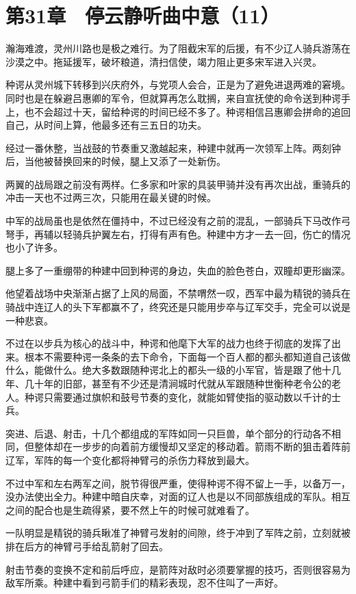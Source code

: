 \section{第31章　停云静听曲中意（11）}

瀚海难渡，灵州川路也是极之难行。为了阻截宋军的后援，有不少辽人骑兵游荡在沙漠之中。拖延援军，破坏粮道，清扫信使，竭力阻止更多宋军进入兴灵。

种谔从灵州城下转移到兴庆府外，与党项人会合，正是为了避免进退两难的窘境。同时也是在躲避吕惠卿的军令，但就算再怎么耽搁，来自宣抚使的命令送到种谔手上，也不会超过十天，留给种谔的时间已经不多了。种谔相信吕惠卿会拼命的追回自己，从时间上算，他最多还有三五日的功夫。

经过一番休整，当战鼓的节奏重又激越起来，种建中就再一次领军上阵。两刻钟后，当他被替换回来的时候，腿上又添了一处新伤。

两翼的战局跟之前没有两样。仁多家和叶家的具装甲骑并没有再次出战，重骑兵的冲击一天也不过两三次，只能用在最关键的时候。

中军的战局虽也是依然在僵持中，不过已经没有之前的混乱，一部骑兵下马改作弓弩手，再辅以轻骑兵护翼左右，打得有声有色。种建中方才一去一回，伤亡的情况也小了许多。

腿上多了一重绷带的种建中回到种谔的身边，失血的脸色苍白，双瞳却更形幽深。

他望着战场中央渐渐占据了上风的局面，不禁喟然一叹，西军中最为精锐的骑兵在骑战中连辽人的头下军都赢不了，终究还是只能用步卒与辽军交手，完全可以说是一种悲哀。

不过在以步兵为核心的战斗中，种谔和他麾下大军的战力也终于彻底的发挥了出来。根本不需要种谔一条条的去下命令，下面每一个百人都的都头都知道自己该做什么，能做什么。绝大多数跟随种谔北上的都头一级的小军官，皆是跟了他十几年、几十年的旧部，甚至有不少还是清涧城时代就从军跟随种世衡种老令公的老人。种谔只需要通过旗帜和鼓号节奏的变化，就能如臂使指的驱动数以千计的士兵。

突进、后退、射击，十几个都组成的军阵如同一只巨兽，单个部分的行动各不相同，但整体却在一步步的向着前方缓慢却又坚定的移动着。箭雨不断的狙击着阵前辽军，军阵的每一个变化都将神臂弓的杀伤力释放到最大。

不过中军和左右两军之间，脱节得很严重，使得种谔不得不留上一手，以备万一，没办法使出全力。种建中暗自庆幸，对面的辽人也是以不同部族组成的军队。相互之间的配合也是生疏得紧，要不然上午的时候可就难看了。

一队明显是精锐的骑兵瞅准了神臂弓发射的间隙，终于冲到了军阵之前，立刻就被排在后方的神臂弓手给乱箭射了回去。

射击节奏的变换不定和前后呼应，是箭阵对敌时必须要掌握的技巧，否则很容易为敌军所乘。种建中看到弓箭手们的精彩表现，忍不住叫了一声好。

